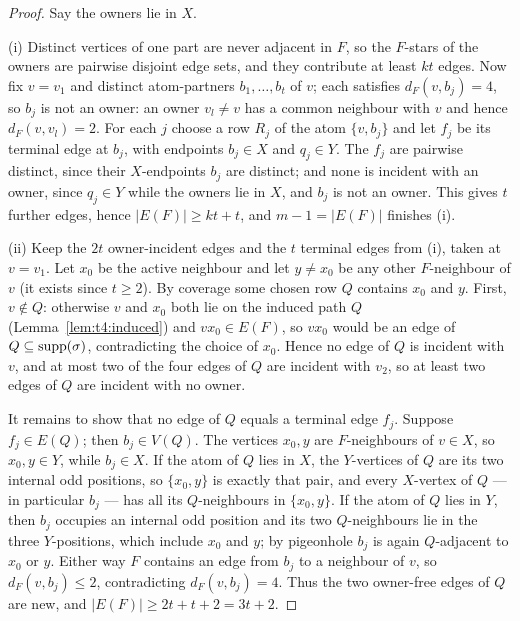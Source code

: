 \begin{proof}
Say the owners lie in \(X\).

(i) Distinct vertices of one part are never adjacent in \(F\), so the
\(F\)-stars of the owners are pairwise disjoint edge sets, and they
contribute at least \(kt\) edges. Now fix \(v=v_1\) and distinct
atom-partners \(b_1,\dots,b_t\) of \(v\); each satisfies
\(d_F(v,b_j)=4\), so \(b_j\) is not an owner: an owner \(v_l\ne v\) has
a common neighbour with \(v\) and hence \(d_F(v,v_l)=2\). For each
\(j\) choose a row \(R_j\) of the atom \(\{v,b_j\}\) and let \(f_j\) be
its terminal edge at \(b_j\), with endpoints \(b_j\in X\) and
\(q_j\in Y\). The \(f_j\) are pairwise distinct, since their
\(X\)-endpoints \(b_j\) are distinct; and none is incident with an
owner, since \(q_j\in Y\) while the owners lie in \(X\), and
\(b_j\) is not an owner. This gives \(t\) further edges, hence
\(|E(F)|\ge kt+t\), and \(m-1=|E(F)|\) finishes (i).

(ii) Keep the \(2t\) owner-incident edges and the \(t\) terminal edges
from (i), taken at \(v=v_1\). Let \(x_0\) be the active neighbour and
let \(y\ne x_0\) be any other \(F\)-neighbour of \(v\) (it exists since
\(t\ge2\)). By coverage some chosen row \(Q\) contains \(x_0\) and
\(y\). First, \(v\notin Q\): otherwise \(v\) and \(x_0\) both lie on
the induced path \(Q\) (Lemma~\ref{lem:t4:induced}) and
\(vx_0\in E(F)\), so \(vx_0\) would be an edge of \(Q\subseteq
\operatorname{supp}(\sigma)\), contradicting the choice of \(x_0\). Hence no edge of
\(Q\) is incident with \(v\), and at most two of the four edges of
\(Q\) are incident with \(v_2\), so at least two edges of \(Q\) are
incident with no owner.

It remains to show that no edge of \(Q\) equals a terminal edge
\(f_j\). Suppose \(f_j\in E(Q)\); then \(b_j\in V(Q)\). The vertices
\(x_0,y\) are \(F\)-neighbours of \(v\in X\), so \(x_0,y\in Y\), while
\(b_j\in X\). If the atom of \(Q\) lies in \(X\), the \(Y\)-vertices of
\(Q\) are its two internal odd positions, so \(\{x_0,y\}\) is exactly
that pair, and every \(X\)-vertex of \(Q\) --- in particular \(b_j\)
--- has all its \(Q\)-neighbours in \(\{x_0,y\}\). If the atom of
\(Q\) lies in \(Y\), then \(b_j\) occupies an internal odd position and
its two \(Q\)-neighbours lie in the three \(Y\)-positions, which
include \(x_0\) and \(y\); by pigeonhole \(b_j\) is again
\(Q\)-adjacent to \(x_0\) or \(y\). Either way \(F\) contains an edge
from \(b_j\) to a neighbour of \(v\), so \(d_F(v,b_j)\le2\),
contradicting \(d_F(v,b_j)=4\). Thus the two owner-free edges of \(Q\)
are new, and \(|E(F)|\ge2t+t+2=3t+2\).
\end{proof}

